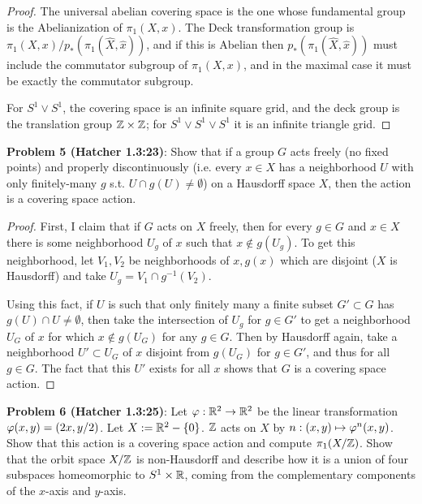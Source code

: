 \documentclass{amsart}
\begin{document}
\begin{proof}
	The universal abelian covering space is the one whose fundamental group is the Abelianization of $\pi_1(X,x)$. The Deck transformation group is $\pi_1(X,x)/p_*(\pi_1(\hat{X},\hat{x}))$, and if this is Abelian then $p_*(\pi_1(\hat{X},\hat{x}))$ must include the commutator subgroup of $\pi_1(X,x)$, and in the maximal case it must be exactly the commutator subgroup.
	
	For $S^1\vee S^1$, the covering space is an infinite square grid, and the deck group is the translation group $\mathbb{Z}\times \mathbb{Z}$; for $S^1\vee S^1\vee S^1$ it is an infinite triangle grid.
	
\end{proof}

\newpage 

\noindent \textbf{Problem 5 (Hatcher 1.3:23)}: Show that if a group $G$ acts freely (no fixed points) and properly discontinuously (i.e. every $x\in X$ has a neighborhood $U$ with only finitely-many $g$ s.t. $U \cap g(U)\neq \emptyset$) on a Hausdorff space $X$, then the action is a covering space action.

\begin{proof}
	First, I claim that if $G$ acts on $X$ freely, then for every $g\in G$ and $x\in X$ there is some neighborhood $U_g$ of $x$ such that $x\not\in g(U_g)$. To get this neighborhood, let $V_1,V_2$ be neighborhoods of $x,g(x)$ which are disjoint ($X$ is Hausdorff) and take $U_g=V_1\cap g^{-1}(V_2)$.
	
	Using this fact, if $U$ is such that only finitely many a finite subset $G'\subset G$ has $g(U)\cap U\neq \emptyset$, then take the intersection of $U_g$ for $g\in G'$ to get a neighborhood $U_G$ of $x$ for which $x\not\in g(U_G)$ for any $g\in G$. Then by Hausdorff again, take a neighborhood $U'\subset U_G$ of $x$ disjoint from $g(U_G)$ for $g\in G'$, and thus for all $g\in G$. The fact that this $U'$ exists for all $x$ shows that $G$ is a covering space action.
	\end{proof}

\newpage 
\noindent \textbf{Problem 6 (Hatcher 1.3:25)}: Let $\varphi:\mathbb{R}^2\to \mathbb{R}^2$ be the linear transformation $\varphi(x,y) = (2x,y/2)$. Let $X:=\mathbb{R}^2-\{0\}$. $\mathbb{Z}$ acts on $X$ by $n: (x,y) \mapsto \varphi^n(x,y)$. Show that this action is a covering space action and compute $\pi_1(X/\mathbb{Z})$. Show that the orbit space $X/\mathbb{Z}$ is non-Hausdorff and describe how it is a union of four subspaces homeomorphic to $S^1\times \mathbb{R}$, coming from the complementary components of the $x$-axis and $y$-axis.
\end{document}
